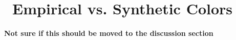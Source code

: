 
    \section{\WS\ Empirical vs. Synthetic Colors}
    \textbf{Not sure if this should be moved to the discussion section}
    
    